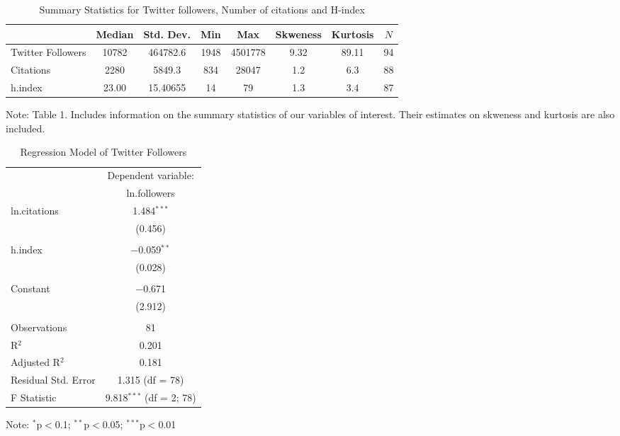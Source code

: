 \documentclass[12pt,english]{article}
\begin{document}
\pagebreak{}

\begin{table}[ht]
    \caption{Summary Statistics for Twitter followers, Number of citations and H-index}
    \label{tab:descriptives} 
\centering
\begin{threeparttable}
\begin{tabular}{lccccccc}
\toprule
                    & Median & Std. Dev. & Min   & Max     & Skweness & Kurtosis & $N$ \\
\midrule
Twitter Followers   & 10782  & 464782.6  & 1948  & 4501778 & 9.32     & 89.11    & 94 \\
Citations           & 2280   & 5849.3    & 834   & 28047   & 1.2      & 6.3      & 88\\
h.index             & 23.00  & 15.40655  & 14    & 79      & 1.3      & 3.4      & 87\\
\bottomrule
\end{tabular}
\footnotesize Note: Table 1. Includes information on the summary statistics of our variables of interest. Their estimates on skweness and kurtosis are also included. 
\end{threeparttable}
\end{table}

\begin{table}[ht]
  \caption{Regression Model of Twitter Followers} 
  \label{tab:inferential}
\centering
\begin{threeparttable}
\begin{tabular}{lc}
\toprule
                  & Dependent variable: \\
                  & ln.followers\\    
\midrule
    ln.citations  & 1.484$^{***}$ \\
                  & (0.456)\\
                  &  \\  
    h.index       & $-$0.059$^{**}$ \\
                  & (0.028) \\ 
                  &\\
    Constant      & $-$0.671 \\ 
                  & (2.912) \\
                  &\\
\midrule
   Observations   & 81 \\ 
   R$^{2}$        & 0.201 \\ 
 Adjusted R$^{2}$ & 0.181 \\ 
Residual Std. Error & 1.315 (df = 78) \\ 
F Statistic & 9.818$^{***}$ (df = 2; 78) \\ 
\bottomrule
\end{tabular}
\footnotesize Note: {$^{*}$p$<$0.1; $^{**}$p$<$0.05; $^{***}$p$<$0.01} 
\end{threeparttable}
\end{table}
\end{document}
